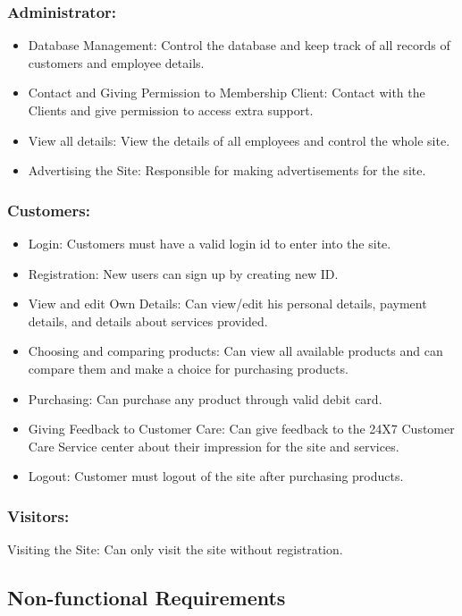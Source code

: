 \documentclass{article}
\begin{document}
\subsubsection{Administrator:}
\begin{itemize}
\item Database Management: Control the database and keep track of all records of customers and employee details.
\item Contact and Giving Permission to Membership Client: Contact with the Clients and give permission to access extra support.
\item View all details: View the details of all employees and control the whole site.
\item Advertising the Site: Responsible for making advertisements for the site.
\end{itemize}
\subsubsection{Customers:}
\begin{itemize}
\item Login: Customers must have a valid login id to enter into the site.
\item Registration: New users can sign up by creating new ID.
\item View and edit Own Details: Can view/edit his personal details, payment details, and details about services provided.
\item Choosing and comparing products: Can view all available products and can compare them and make a choice for purchasing 		products.
\item Purchasing: Can purchase any product through valid debit card.
\item Giving Feedback to Customer Care: Can give feedback to the 24X7 Customer Care Service center about their impression for the 		site and services.
\item Logout: Customer must logout of the site after purchasing products.
\end{itemize}
\subsubsection{Visitors:} Visiting the Site: Can only visit the site without registration.

	
	
\subsection{Non-functional Requirements}
\end{document}
